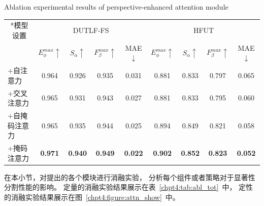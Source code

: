 \begin{table}[!ht]
	{Ablation experimental results of perspective-enhanced attention module}
	\centering
	\label{chpt4:tab:abl_attn}
		\begin{tabular}{lcccccccc}
			\toprule[2pt]  %
			
			\multicolumn{1}{c}{ \multirow{2}*{模型设置}}	& \multicolumn{4}{c}{DUTLF-FS} & \multicolumn{4}{c}{HFUT} \\ 
			
			
			\cmidrule(r){2-5} \cmidrule(r){6-9} 
			
			& $E_{\phi}^{max}\uparrow$ & $S_{\alpha }\uparrow $ & $F_{\beta}^{max}\uparrow$ & MAE$\downarrow$ 
			& $E_{\phi}^{max}\uparrow$ & $S_{\alpha }\uparrow $ & $F_{\beta}^{max}\uparrow$ & MAE$\downarrow$
			\\
			
			\midrule
			
			
			
			+自注意力 
			& 0.964 & 0.926 & 0.935 & 0.031 
			& 0.881 & 0.833 & 0.797 & 0.065   \\
			
			+交叉注意力
			& 0.965 & 0.931 & 0.943 & 0.027 
			& 0.881 & 0.833 & 0.795 & 0.060   \\
			
			+自掩码注意力  
			& 0.965 & 0.935 & 0.944 & 0.025 
			& 0.894 & 0.849 & 0.821 & 0.058   \\
			
			+掩码注意力   
			& \textbf{0.971} & \textbf{0.940} & \textbf{0.949} & \textbf{0.022} 
			& \textbf{0.902} & \textbf{0.852} & \textbf{0.823} & \textbf{0.052}  \\
			
			\bottomrule[2pt]
		\end{tabular}
\end{table}




在本小节，对提出的各个模块进行消融实验，
分析每个组件或者策略对于显著性分割性能的影响。
定量的消融实验结果展示在表~\ref{chpt4:tab:abl_tot}~中，
定性的消融实验结果展示在图~\ref{chpt4:figure:attn_show}~中。



